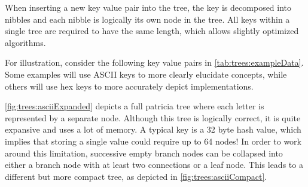 When inserting a new key value pair into the tree, the key is decomposed into nibbles and each nibble is logically its own node in the tree.
All keys within a single tree are required to have the same length, which allows slightly optimized algorithms.

For illustration, consider the following key value pairs in \autoref{tab:trees:exampleData}.
Some examples will use ASCII keys to more clearly elucidate concepts, while others will use hex keys to more accurately depict \codenamespace implementations.

\autoref{fig:trees:asciiExpanded} depicts a full patricia tree where each letter is represented by a separate node.
Although this tree is logically correct, it is quite expansive and uses a lot of memory.
A typical key is a 32 byte hash value, which implies that storing a single value could require up to 64 nodes!
In order to work around this limitation, successive empty branch nodes can be collapsed into either a branch node with at least two connections or a leaf node.
This leads to a different but more compact tree, as depicted in \autoref{fig:trees:asciiCompact}.

\begin{table}[ht]
\end{table}

\begin{figure}[H]
\end{figure}

